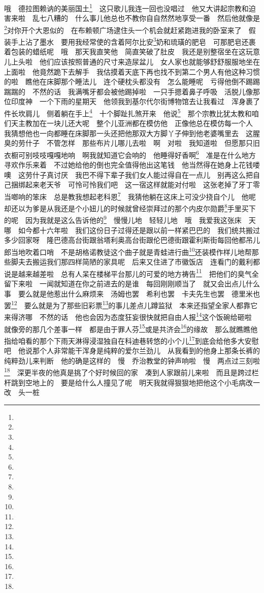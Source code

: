 \par 哦　德拉图赖讷的美丽国土\footnote{}　这只歌儿我连一回也没唱过　他又大讲起宗教和迫害来啦　乱七八糟的　什么事儿他总也不教你自自然然地享受一番　然后他就像是\footnote{}对你开个大恩似的　在布赖顿广场逮住头一个机会就赶紧跑进我的卧室来了　假装手上沾了墨水　要用我经常使的含着阿尔比安\footnote{}奶和琉璜的肥皂　可那肥皂还裹着包装的蜡纸呢　哦　那天我直笑他　简直笑破了肚皮　我还是别整宿坐在这玩意儿上头啦　他们应该按照普通的尺寸来造尿盆儿　女人家也就能够舒舒服服地坐在上面啦　他竟然跪下去解手　我估摸着天底下再也找不到第二个男人有他这种习惯的啦　瞧他在床脚那个睡法儿　连个硬枕头都没有　怎么能睡呢　亏得他倒不踢踢踹踹的　不然的话　我满嘴牙都会被他踢掉啦　一只手摁着鼻子呼吸　活脱儿像那位印度神　一个下雨的星期天　他领我到基尔代尔街博物馆去让我看过　浑身裹了件长坎肩儿　侧着躺在手上\footnote{}　十个脚趾扎煞开来　他说\footnote{}　那个宗教比犹太教和咱们天主教加在一块儿还大呢　整个儿亚洲都在模仿他　正像他总在模仿每一个人　我猜想他也一向都睡在床脚那一头还把他那双大方脚丫子伸到他老婆嘴里去　这腥臭的劳什子　不管怎样　那些布片儿哪儿去啦　啊　对啦　我知道啦　但愿那只旧衣橱可别吱吱嘎嘎地响　啊我就知道它会响的　他睡得好香啊\footnote{}　准是在什么地方寻欢作乐来着　不过她给他的倒也完全值得他出这笔钱　他当然得在她身上花钱喽　噢　这劳什子真讨厌　我巴不得下辈子我们女人能过得自在一点儿　别再这么把自己捆绑起来老天爷　可怜可怜我们吧　这一宿这样就能对付啦　这张老掉了牙丁零当啷响的笨床　总是教我想起老科恩\footnote{}　我猜他躺在这床上可没少挠自个儿　他呢　却还以为爹是从我还是个小妞儿的时候就曾经崇拜过的那个内皮尔勋爵\footnote{}手里买下的呢　因为我就是这么告诉他的\footnote{}　慢慢儿地　轻轻儿地　哦　我爱我这张床　天哪　如今都十六年啦　我们这份日子过得还是跟以前一样紧巴巴的　我们统共搬过多少回家呀　隆巴德高台街跟翁塔利奥高台街跟伦巴德街跟霍利斯街每回他都吊儿郎当地吹着口哨　不是胡格诺教徒这个曲子就是青蛙进行曲\footnote{}还装模作样儿地帮那些脚夫去搬运我们那四样简陋的家具呢　后来又住进了市徽饭店　连看门的戴利都说是越来越差啦　总有人呆在楼梯平台那儿的可爱的地方祷告\footnote{}　把他们的臭气全留下来啦　一闻就知道在你之前进去的是谁　每回刚刚顺当了　就又会出点儿什么事　要么就是他惹出什么麻烦来　汤姆也罢　希利也罢　卡夫先生也罢　德里米也罢\footnote{}　要么就是为了那些旧彩票\footnote{}的事儿差点儿蹲监狱　本来还指望全家人都靠它来得济哪　不然的话　他也会因为态度狂妄很快就把自由人报\footnote{}这个饭碗给砸啦　就像旁的那几个差事一样　都是由于罪人芬\footnote{}或是共济会\footnote{}的缘故　那么就瞧瞧他指给咱看的那个下雨天淋得浸湿独自在科迪巷转悠的小个儿\footnote{}到底会给他多大安慰吧　他说那个人非常能干浑身是纯粹的爱尔兰劲儿　从我看到的他身上那条长裤的纯粹劲儿来判断　他的确是这样的　慢　乔治教堂的钟声响啦　慢　两点过三刻啦\footnote{}　深更半夜的他真是挑了个好时候回的家　凑到人家跟前儿来啦　而且是跨过栏杆跳到空地上的　要是给什么人撞见了呢　明天我就得狠狠地把他这个小毛病改一改　头一桩　
